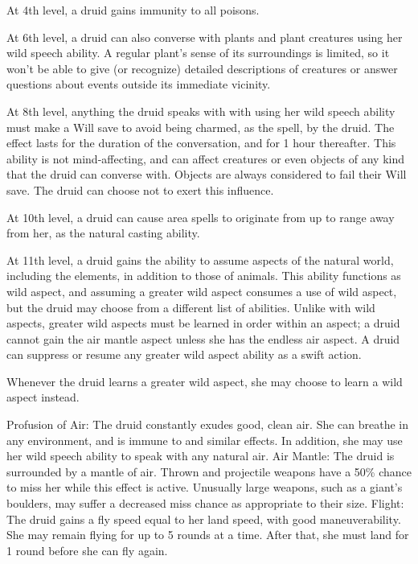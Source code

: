  At 4th level, a druid gains immunity to all poisons.

 At 6th level, a druid can also converse with plants and plant creatures using her wild speech ability. A regular plant's sense of its surroundings is limited, so it won't be able to give (or recognize) detailed descriptions of creatures or answer questions about events outside its immediate vicinity.

 At 8th level, anything the druid speaks with with using her wild speech ability must make a Will save to avoid being charmed, as the  spell, by the druid. The effect lasts for the duration of the conversation, and for 1 hour thereafter. This ability is not mind-affecting, and can affect creatures or even objects of any kind that the druid can converse with. Objects are always considered to fail their Will save.  The druid can choose not to exert this influence.

 At 10th level, a druid can cause area spells to originate from up to \rngclose range away from her, as the natural casting ability.

 At 11th level, a druid gains the ability to assume aspects of the natural world, including the elements, in addition to those of animals. This ability functions as wild aspect, and assuming a greater wild aspect consumes a use of wild aspect, but the druid may choose from a different list of abilities. Unlike with wild aspects, greater wild aspects must be learned in order within an aspect; a druid cannot gain the air mantle aspect unless she has the endless air aspect. A druid can suppress or resume any greater wild aspect ability as a swift action.

Whenever the druid learns a greater wild aspect, she may choose to learn a wild aspect instead.
\begin{greaterwildaspect}
\wilditem Profusion of Air: The druid constantly exudes good, clean air. She can breathe in any environment, and is immune to  and similar effects. In addition, she may use her wild speech ability to speak with any natural air.
\wilditem Air Mantle: The druid is surrounded by a mantle of air. Thrown and projectile weapons have a 50\% chance to miss her while this effect is active. Unusually large weapons, such as a giant's boulders, may suffer a decreased miss chance as appropriate to their size.
\wilditemplus Flight: The druid gains a fly speed equal to her land speed, with good maneuverability. She may remain flying for up to 5 rounds at a time. After that, she must land for 1 round before she can fly again.
\end{greaterwildaspect}

